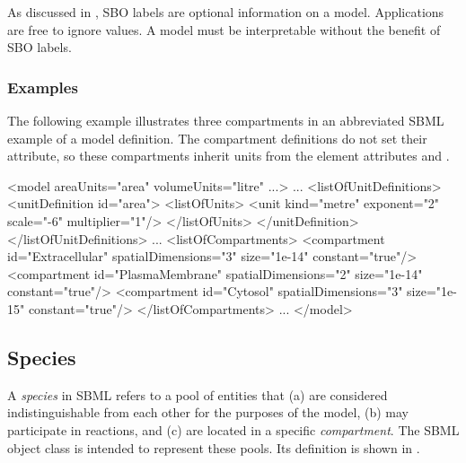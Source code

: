 As discussed in , SBO labels are optional
information on a model.  Applications are free to ignore
 values.  A model must be interpretable without the
benefit of SBO labels.


\subsubsection{Examples}

The following example illustrates three compartments in an
abbreviated SBML example of a model definition.  The compartment
definitions do not set their  attribute, so 
these compartments inherit units from the  element
attributes  and .

\begin{example}
<model areaUnits="area" volumeUnits="litre" ...>
    ...
    <listOfUnitDefinitions>
        <unitDefinition id="area">
            <listOfUnits>
                <unit kind="metre" exponent="2" scale="-6" multiplier="1"/>
            </listOfUnits>
        </unitDefinition>
    </listOfUnitDefinitions>
    ...
    <listOfCompartments>
        <compartment id="Extracellular"  spatialDimensions="3" size="1e-14" constant="true"/>
        <compartment id="PlasmaMembrane" spatialDimensions="2" size="1e-14" constant="true"/>
        <compartment id="Cytosol"        spatialDimensions="3" size="1e-15" constant="true"/>
    </listOfCompartments>
    ...
</model>
\end{example}


\subsection{Species}
\label{sec:species}

A \emph{species} in SBML refers to a pool of entities that (a) are
considered indistinguishable from each other for the purposes of
the model, (b) may participate in reactions, and (c) are located in a
specific \emph{compartment}.  The SBML \Species object class is
intended to represent these pools.  Its definition is shown in
.

